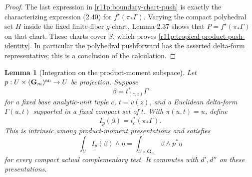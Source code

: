 \documentclass[11pt,a4paper]{article}
\newtheorem{lemma}[theorem]{Lemma}
\theoremstyle{definition}
\theoremstyle{remark}
\begin{document}
\begin{proof}
The last expression in \eqref{r11p:boundary-chart-push} is exactly
the characterizing expression (2.40) for
$f^\star(\pi_*\Gamma)$.  Varying the compact polyhedral set $H$
inside the fixed finite-fiber $g$-chart, Lemma 2.37 shows that
$P=f^\star(\pi_*\Gamma)$ on that chart.  These charts cover $S$,
which proves \eqref{r11p:tropical-product-push-identity}.
In particular the polyhedral pushforward has the asserted
delta-form representative; this is a conclusion of the calculation.
\end{proof}

\begin{lemma}[Integration on the product-moment subspace]
\label{r11p:product-integration}
Let $p:U\times(\mathbf G_m)^{\rm an}\to U$ be projection.  Suppose
\[
                   \beta=t_{(c,z)}^*\Gamma
\]
for a fixed base analytic-unit tuple $c$, $t=v(z)$, and a Euclidean
delta-form $\Gamma(u,t)$ supported in a fixed compact set of $t$.
With $\pi(u,t)=u$, define
\[
                       I_p(\beta)=t_c^*(\pi_*\Gamma).
\tag{MT6}\label{r11p:product-definition}
\]
This is intrinsic among product-moment presentations and satisfies
\[
             \int_UI_p(\beta)\wedge\eta
                    =\int_{U\times\mathbf G_m}\beta\wedge p^*\eta
\tag{MT7}\label{r11p:product-pairing}
\]
for every compact actual complementary test.  It commutes with
$d',d''$ on these presentations.
\end{lemma}
\end{document}
